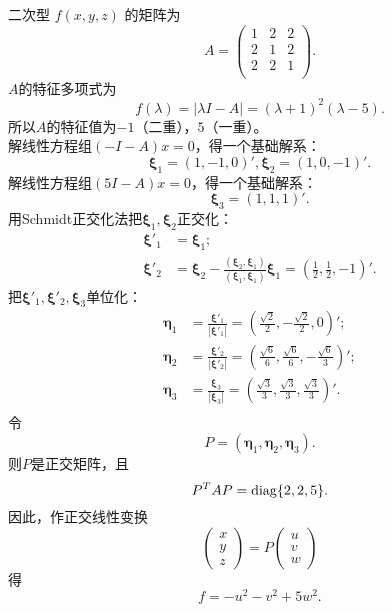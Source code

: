 \begin{enumerate}[1~]
\begin{solution}
二次型 $f(x, y, z)$ 的矩阵为\[
A=\left( \begin{matrix}
	1&		2&		2\\
	2&		1&		2\\
	2&		2&		1\\
\end{matrix} \right) .
\]
$A$的特征多项式为\[
f(\lambda)=|\lambda I-A|=(\lambda+1)^2(\lambda-5).
\]
所以$A$的特征值为$-1$（二重），$5$（一重）。\\
解线性方程组$(-I-A)x=0$，得一个基础解系：\[
\boldsymbol{\xi}_1=(1, -1, 0)', \boldsymbol{\xi}_2=(1, 0, -1)'.
\]
解线性方程组$(5I-A)x=0$，得一个基础解系：\[
\boldsymbol{\xi}_3=(1, 1, 1)'.
\]
用Schmidt正交化法把$\boldsymbol{\xi}_1, \boldsymbol{\xi}_2$正交化：\begin{align*}
\boldsymbol{\xi}'_1&=\boldsymbol{\xi}_1;\\
\boldsymbol{\xi}'_2&=\boldsymbol{\xi}_2-\frac{(\boldsymbol{\xi}_2, \boldsymbol{\xi}_1)}{(\boldsymbol{\xi}_1, \boldsymbol{\xi}_1)}\boldsymbol{\xi}_1=\left(\frac12, \frac12, -1\right)'.
\end{align*}
把$\boldsymbol{\xi}'_1, \boldsymbol{\xi}'_2, \boldsymbol{\xi}_3$单位化：\begin{align*}
\boldsymbol{\eta}_1&=\frac{\boldsymbol{\xi}'_1}{|\boldsymbol{\xi}'_1|}=\left(\frac{\sqrt{2}}{2}, -\frac{\sqrt{2}}{2}, 0\right)';\\
\boldsymbol{\eta}_2&=\frac{\boldsymbol{\xi}'_2}{|\boldsymbol{\xi}'_2|}=\left(\frac{\sqrt{6}}{6}, \frac{\sqrt{6}}{6}, -\frac{\sqrt{6}}{3}\right)';\\
\boldsymbol{\eta}_3&=\frac{\boldsymbol{\xi}_3}{|\boldsymbol{\xi}_3|}=\left(\frac{\sqrt{3}}{3}, \frac{\sqrt{3}}{3}, \frac{\sqrt{3}}{3}\right)'.\\
\end{align*}
令\[
P=(\boldsymbol{\eta}_1, \boldsymbol{\eta}_2, \boldsymbol{\eta}_3).
\]
则$P$是正交矩阵，且\[
P^T A P={\rm diag}\{2, 2, 5\}.
\]
因此，作正交线性变换\[
\left( \begin{array} { l } { x } \\ { y } \\ { z } \end{array} \right) = P \left( \begin{array} { l } { u } \\ { v } \\ { w } \end{array} \right)
\]
得\[
f=-u^2-v^2+5w^2.
\]
\end{solution}


\end{enumerate}
